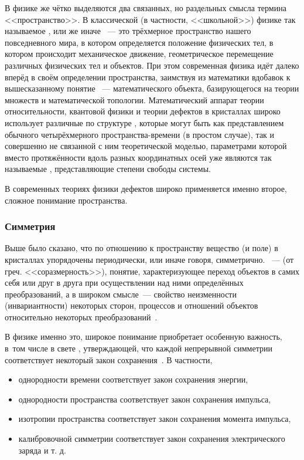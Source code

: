 \documentclass[a4paper, 14pt, titlepage]{extarticle}
\begin{document}
  В физике же чётко выделяются два связанных, но раздельных смысла термина <<пространство>>.
  В классической (в частности, <<школьной>>) физике так называемое , или же иначе
  ~--- это трёхмерное пространство нашего повседневного мира, в котором
  определяется положение физических тел, в котором происходит механическое движение, геометрическое
  перемещение различных физических тел и объектов. При этом современная физика идёт далеко вперёд
  в своём определении пространства, заимствуя из математики вдобавок к вышесказанному понятие ~--- математического объекта, базирующегося на теории множеств и математической
  топологии. Математический аппарат теории относительности, квантовой физики и теории дефектов в
  кристаллах широко использует различные по структуре ,
  которые могут быть как представлением обычного четырёхмерного пространства-времени (в простом
  случае), так и совершенно не связанной с ним теоретической моделью, параметрами которой вместо
  протяжённости вдоль разных координатных осей уже являются так называемые , представляющие степени свободы системы.

  В современных теориях физики дефектов широко применяется именно второе, сложное понимание пространства.

  \subsubsection{Симметрия}

  Выше было сказано, что по отношению к пространству вещество (и поле) в кристаллах упорядочены
  периодически, или иначе говоря, симметрично. ~--- (от греч. <<соразмерность>>),
  понятие, характеризующее переход объектов в самих себя или друг в друга при осуществлении над ними
  определённых преобразований, а в широком смысле~--- свойство неизменности (инвариантности)
  некоторых сторон, процессов и отношений объектов относительно некоторых преобразований~\cite{enc-phylosophy-83}.

  В физике именно это, широкое понимание приобретает особенную важность, в~том числе в свете
  , утверждающей, что каждой непрерывной симметрии соответствует некоторый закон
  сохранения~\cite{noether-invariante}. В частности,
  \begin{itemize}
    \item однородности времени соответствует закон сохранения энергии,
    \item однородности пространства соответствует закон сохранения импульса,
    \item изотропии пространства соответствует закон сохранения момента импульса,
    \item калибровочной симметрии соответствует закон сохранения электрического заряда и т. д.
  \end{itemize}
\end{document}
